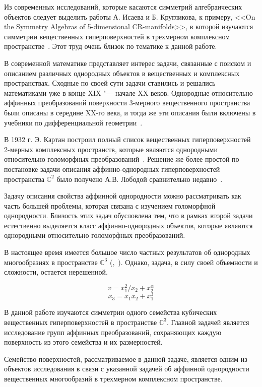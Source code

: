 \documentclass[../main.tex]{subfiles}
\begin{document}
Из современных исследований, которые касаются симметрий алгебраических объектов следует выделить работы А. Исаева и Б. Кругликова, к примеру, <<On the Symmetry Algebras of 5-dimensional CR-manifolds>>, в которой изучаются симметрии вещественных гиперповерхностей в трехмерном комплексном пространстве~\cite{IK}. Этот труд очень близок по тематике к данной работе.

В современной математике представляет интерес задачи, связанные с поиском и описанием различных однородных объектов в вещественных и комплексных пространствах. Сходные по своей сути задачи ставились и решались математиками уже в конце XIX "--- начале XX веков. Однородные относительно аффинных преобразований поверхности 3-мерного вещественного пространства были описаны в середине XX-го века, и тогда же эти описания были включены в учебники по дифференциальной геометрии~\cite{shirokov}.

В 1932 г. Э. Картан построил полный список вещественных гиперповерхностей 2-мерных комплексных пространств, которые являются однородными относительно голоморфных преобразований~\cite{cartan}. Решение же более простой по постановке задачи описания аффинно-однородных гиперповерхностей пространства $\mathbb{C}^2$ было получено А.В. Лободой сравнительно недавно~\cite{loboda_c2}.

Задачу описания свойства аффинной однородности можно рассматривать как часть большей проблемы, которая связана с изучением голоморфной однородности. Близость этих задач обусловлена тем, что в рамках второй задачи естественно выделяется класс аффинно-однородных объектов, которые являются однородными относительно голоморфных преобразований.

В настоящее время имеется большое число частных результатов об однородных многообразиях в пространстве $\mathbb{C}^3$ (\cite{ALS},~\cite{loboda_hodarev}). Однако, задача, в силу своей объемности и сложности, остается нерешенной.

$$
v = x_1^2 / x_2 + x_2^{\alpha}
$$
$$
x_3 = x_1 x_2 + x_1^3
$$

В данной работе изучаются симметрии одного семейства кубических вещественных гиперповерхностей в пространстве $\mathbb{C}^3$. Главной задачей является исследование групп аффинных преобразований, сохраняющих каждую поверхность из этого семейства и их размерностей.

Семейство поверхностей, рассматриваемое в данной задаче, является одним из объектов исследования в связи с указанной задачей об аффинной однородности вещественных многообразий в трехмерном комплексном пространстве.
\end{document}
